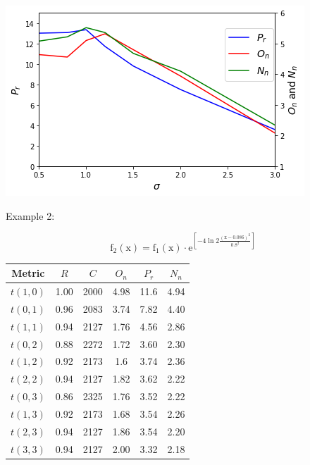 \documentclass[smallextended]{svjour3}       %
\begin{document}
\begin{multicols}{2}
\begin{center}
  \includegraphics[width=\linewidth]{GA_images/sigma-parameter.png}
  \label{fig:sigma}
\end{center}

Example 2:

$$
\mathrm{f}_{2}(\mathrm{x})=\mathrm{f}_{1}(\mathrm{x}) \cdot \mathrm{e}^{\left[-4 \ln 2 \frac{(\mathrm{x}-0.086)^{2}}{0.8^{2}}\right]}
$$



\begin{tabular}{cccccc}
	\toprule
    Metric & $R$ & $C$ & $O_{n}$ & $P_{r}$ & $N_{n}$\\
	\midrule
    $t(1,0)$ & 1.00 & 2000 & 4.98 & 11.6 & 4.94 \\
    $t(0,1)$ & 0.96 & 2083 & 3.74 & 7.82 & 4.40 \\
    $t(1,1)$ & 0.94 & 2127 & 1.76 & 4.56 & 2.86 \\
    $t(0,2)$ & 0.88 & 2272 & 1.72 & 3.60 & 2.30 \\
    $t(1,2)$ & 0.92 & 2173 & 1.6 & 3.74 & 2.36 \\
    $t(2,2)$ & 0.94 & 2127 & 1.82 & 3.62 & 2.22 \\
    $t(0,3)$ & 0.86 & 2325 & 1.76 & 3.52 & 2.22 \\
    $t(1,3)$ & 0.92 & 2173 & 1.68 & 3.54 & 2.26 \\
    $t(2,3)$ & 0.94 & 2127 & 1.86 & 3.54 & 2.20 \\
    $t(3,3)$ & 0.94 & 2127 & 2.00 & 3.32 & 2.18 \\
	\bottomrule
\end{tabular}



\end{multicols}
\end{document}
